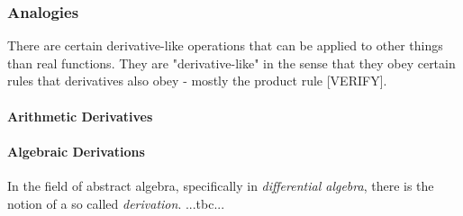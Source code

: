 \subsubsection{Analogies}
There are certain derivative-like operations that can be applied to other things than real functions. They are "derivative-like" in the sense that they obey certain rules that derivatives also obey - mostly the product rule [VERIFY].

\paragraph{Arithmetic Derivatives}

\paragraph{Algebraic Derivations}
In the field of abstract algebra, specifically in \emph{differential algebra}, there is the notion of a so called \emph{derivation}. ...tbc...


%

\begin{comment}
	
This video has an interesting alternative definition of the derivative:

https://www.youtube.com/watch?v=XfWgfZ5V2qI  New Definition of the Derivative

f'(x) = \lim_{t \rightarrow 1} \frac{f(tx) - f(x)}{t x  - x}

which is often algebraically simpler to evaluate - especially for powers of x. No binomial theorem is needed. 

It has also this useful formula:
(t^n - 1) = (t-1) (1 + t + t^2 + t^3 + ... + t^{n-1})	
which might be integrated somewhere in the elementary algebra section

Differentiting a function f of x with respect to another function g of x:
https://www.youtube.com/watch?v=1Ci2z5YE6Rg
example: differentiate x^x with respect to x^2. Apply the chain rule to a function
f(g(x))  ->  df/dx = df/dg * dg/dx  ->  df/dg = (df/dx) / (dg/dx)
But what does that even mean? I think, we can interpret df/dg it as follows: We have two given functions f,g of x and ask: how much does f (infinitesimally) change, if we change g (infinitesimally)? An example could be: x is a signal amplitude, f is the signal power, i.e. f(x) ~ x^2 and g are decibels g(x) = 20*log10(x). The question would be: how much does the signal *power* change when we change the signal *level* in dB.

Maybe see also:
https://en.wikipedia.org/wiki/Riemann%

https://en.wikipedia.org/wiki/Quantum_calculus


	
\end{comment}

